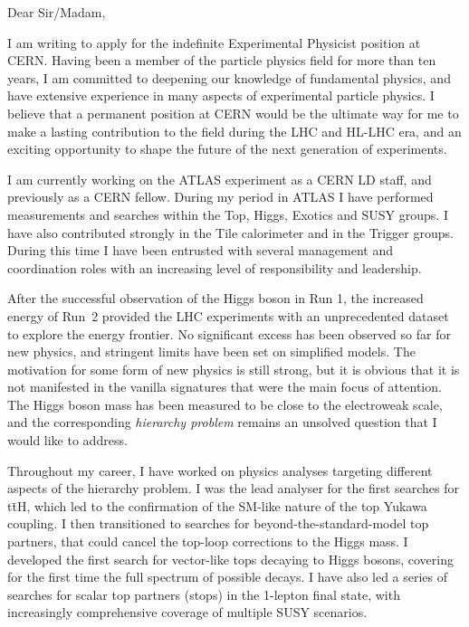 \documentclass[11pt,a4paper,sans]{moderncv}        %
\begin{document}
\makecvtitle
\cvitem{}{
}
\vspace{3.4 cm}
Dear Sir/Madam,
\newline

I am writing to apply for the indefinite Experimental Physicist position at CERN.
Having been a member of the particle physics field for more than ten years, I am committed to deepening our knowledge of fundamental physics, and have extensive experience in many aspects of experimental particle physics. I believe that a permanent position at CERN would be the ultimate way for me to make a lasting contribution to the field during the LHC and HL-LHC era, and an exciting opportunity to shape the future of the next generation of experiments.
\newline

I am currently working on the ATLAS experiment as a CERN LD staff, and previously as a CERN fellow. 
During my period in ATLAS I have performed measurements and searches within the Top, Higgs, Exotics and SUSY groups. I have also contributed strongly in the Tile calorimeter and in the Trigger groups. During this time I have been entrusted with several management and coordination roles with an increasing level of responsibility and leadership. 
\newline

After the successful observation of the Higgs boson in Run 1, the increased energy of Run~2 provided the LHC experiments with an unprecedented dataset to explore the energy frontier. No significant excess has been observed so far for new physics, and stringent limits have been set on simplified models.
The motivation for some form of new physics is still strong, but it is obvious that it is not manifested in the vanilla signatures that were the main focus of attention.
The Higgs boson mass has been measured to be close to the electroweak scale, and the corresponding \emph{hierarchy problem} remains an unsolved question that I would like to address.
\newline

Throughout my career, I have worked on physics analyses targeting different aspects of the hierarchy problem. I was the lead analyser for the first searches for t\=tH, which led to the confirmation of the SM-like nature of the top Yukawa coupling. I then transitioned to searches for beyond-the-standard-model top partners, that could cancel the top-loop corrections to the Higgs mass. I developed the first search for vector-like tops decaying to Higgs bosons, covering for the first time the full spectrum of possible decays. I have also led a series of searches for scalar top partners (stops) in the 1-lepton final state, with increasingly comprehensive coverage of multiple SUSY scenarios.
\newline
\end{document}
